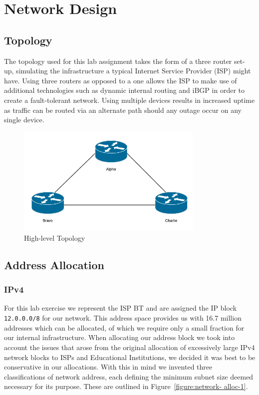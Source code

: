 \chapter{Network Design}

\section{Topology}

The topology used for this lab assignment takes the form of a three router set-
up, simulating the infrastructure a typical Internet Service Provider (ISP)
might have. Using three routers as opposed to a one allows the ISP to make use
of additional technologies such as dynamic internal routing and iBGP in order to
create a fault-tolerant network. Using multiple devices results in increased
uptime as traffic can be routed via an alternate path should any outage occur on
any single device.

\begin{figure}[!ht]     \caption{High-level Topology}     \centering
\includegraphics[width=0.8\textwidth]{images/networkTopology.png} \end{figure}

\section{Address Allocation} \subsection{IPv4} For this lab exercise we
represent the ISP BT and are assigned the IP block \texttt{12.0.0.0/8} for our
network. This address space provides us with 16.7 million addresses which can be
allocated, of which we require only a small fraction for our internal
infrastructure. When allocating our address block we took into account the
issues that arose from the original allocation of excessively large IPv4 network
blocks to ISPs and Educational Institutions, we decided it was best to be
conservative in our allocations. With this in mind we invented three
classifications of network address, each defining the minimum subnet size deemed
necessary for its purpose. These are outlined in Figure~\ref{figure:network-
alloc-1}.

